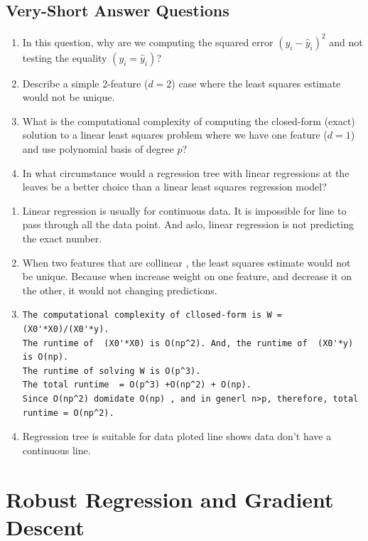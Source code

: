 \documentclass{article}
\def\blu#1{{\color{blu}#1}}
\def\enum#1{\begin{enumerate}#1\end{enumerate}}
\begin{document}
\subsection{Very-Short Answer Questions}

\blu{
\enum{
\item In this question, why are we computing the squared error $(y_i -  \hat{y}_i)^2$ and not testing the equality $(y_i = \hat{y}_i)$?
\item Describe a simple 2-feature ($d=2$) case where the least squares estimate would not be unique.
\item What is the computational complexity of computing the closed-form (exact) solution to a linear least squares problem where we have one feature ($d = 1$) and use polynomial basis of degree $p$?
\item  In what circumstance would a regression tree with linear regressions at the leaves be a better choice than a linear least squares regression model?
}}

\begin{enumerate}
\item Linear regression is usually for continuous data. It is impossible for line to pass through all the data point. And aslo, linear regression is not predicting the exact number.
\item 
When two features that are collinear , the least squares estimate would not be unique. Because when increase weight on one feature, and decrease it on the other, it would not changing predictions.

\item 

  \begin{verbatim}
The computational complexity of cllosed-form is W = (X0'*X0)/(X0'*y). 
The runtime of  (X0'*X0) is O(np^2). And, the runtime of  (X0'*y)  is O(np). 
The runtime of solving W is O(p^3).
The total runtime  = O(p^3) +O(np^2) + O(np).
Since O(np^2) domidate O(np) , and in generl n>p, therefore, total runtime = O(np^2).
  \end{verbatim}


\item
Regression tree is suitable for data ploted line shows data don't have a continuous line.  

\end{enumerate}

\section{Robust Regression and Gradient Descent}
\end{document}
